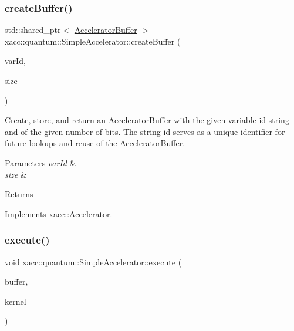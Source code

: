 \subsubsection{\texorpdfstring{create\+Buffer()}{createBuffer()}\hspace{0.1cm}{\footnotesize\ttfamily [2/2]}}
{\footnotesize\ttfamily std\+::shared\+\_\+ptr$<$ \hyperlink{a02444}{Accelerator\+Buffer} $>$ xacc\+::quantum\+::\+Simple\+Accelerator\+::create\+Buffer (\begin{DoxyParamCaption}\item[{const std\+::string \&}]{var\+Id,  }\item[{const int}]{size }\end{DoxyParamCaption})\hspace{0.3cm}{\ttfamily [virtual]}}

Create, store, and return an \hyperlink{a02444}{Accelerator\+Buffer} with the given variable id string and of the given number of bits. The string id serves as a unique identifier for future lookups and reuse of the \hyperlink{a02444}{Accelerator\+Buffer}.


\begin{DoxyParams}{Parameters}
{\em var\+Id} & \\
\hline
{\em size} & \\
\hline
\end{DoxyParams}
\begin{DoxyReturn}{Returns}

\end{DoxyReturn}


Implements \hyperlink{a02432_a064a2dbd58338364115c260267806945}{xacc\+::\+Accelerator}.

\mbox{\label{a01244_a3089b15fbbaa83abf2941bd3b8d2d3c6}} 
\subsubsection{\texorpdfstring{execute()}{execute()}}
{\footnotesize\ttfamily void xacc\+::quantum\+::\+Simple\+Accelerator\+::execute (\begin{DoxyParamCaption}\item[{std\+::shared\+\_\+ptr$<$ \hyperlink{a02444}{Accelerator\+Buffer} $>$}]{buffer,  }\item[{const std\+::shared\+\_\+ptr$<$ \hyperlink{a02456}{xacc\+::\+Function} $>$}]{kernel }\end{DoxyParamCaption})\hspace{0.3cm}{\ttfamily [virtual]}}

